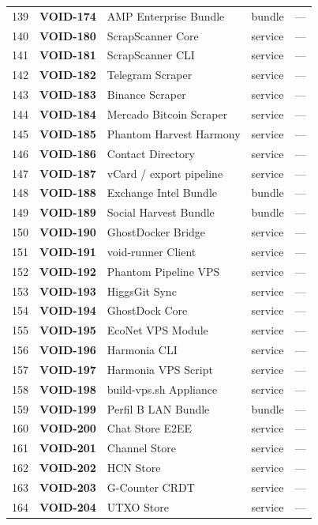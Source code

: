 \documentclass[10pt,a4paper,landscape]{article}
\begin{document}
\begin{longtable}{@{}rl p{4.2cm} p{1.4cm} p{3.8cm}@{}}
139 & \textbf{VOID-174} & AMP Enterprise Bundle & bundle & — \\
140 & \textbf{VOID-180} & ScrapScanner Core & service & — \\
141 & \textbf{VOID-181} & ScrapScanner CLI & service & — \\
142 & \textbf{VOID-182} & Telegram Scraper & service & — \\
143 & \textbf{VOID-183} & Binance Scraper & service & — \\
144 & \textbf{VOID-184} & Mercado Bitcoin Scraper & service & — \\
145 & \textbf{VOID-185} & Phantom Harvest Harmony & service & — \\
146 & \textbf{VOID-186} & Contact Directory & service & — \\
147 & \textbf{VOID-187} & vCard / export pipeline & service & — \\
148 & \textbf{VOID-188} & Exchange Intel Bundle & bundle & — \\
149 & \textbf{VOID-189} & Social Harvest Bundle & bundle & — \\
150 & \textbf{VOID-190} & GhostDocker Bridge & service & — \\
151 & \textbf{VOID-191} & void-runner Client & service & — \\
152 & \textbf{VOID-192} & Phantom Pipeline VPS & service & — \\
153 & \textbf{VOID-193} & HiggsGit Sync & service & — \\
154 & \textbf{VOID-194} & GhostDock Core & service & — \\
155 & \textbf{VOID-195} & EcoNet VPS Module & service & — \\
156 & \textbf{VOID-196} & Harmonia CLI & service & — \\
157 & \textbf{VOID-197} & Harmonia VPS Script & service & — \\
158 & \textbf{VOID-198} & build-vps.sh Appliance & service & — \\
159 & \textbf{VOID-199} & Perfil B LAN Bundle & bundle & — \\
160 & \textbf{VOID-200} & Chat Store E2EE & service & — \\
161 & \textbf{VOID-201} & Channel Store & service & — \\
162 & \textbf{VOID-202} & HCN Store & service & — \\
163 & \textbf{VOID-203} & G-Counter CRDT & service & — \\
164 & \textbf{VOID-204} & UTXO Store & service & — \\

\end{longtable}
\end{document}
